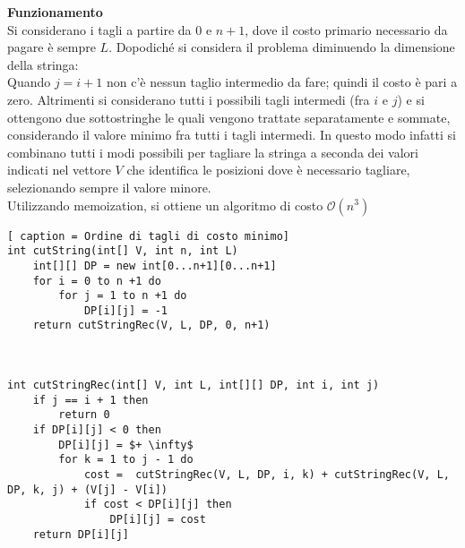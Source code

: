 \documentclass[../cheatSheetAlgoritmi.tex]{subfiles}
\begin{document}
\textbf{Funzionamento} \\
Si considerano i tagli a partire da $0$ e $n + 1$, dove il costo primario necessario da pagare è sempre $L$. Dopodiché si considera il problema diminuendo la dimensione della stringa: \\
Quando $j = i + 1$ non c'è nessun taglio intermedio da fare; quindi il costo è pari a zero. Altrimenti si considerano tutti i possibili tagli intermedi (fra $i$ e $j$) e si ottengono due sottostringhe le quali vengono trattate separatamente e sommate, considerando il valore minimo fra tutti i tagli intermedi. In questo modo infatti si combinano tutti i modi possibili per tagliare la stringa a seconda dei valori indicati nel vettore $V$ che identifica le posizioni dove è necessario tagliare, selezionando sempre il valore minore. \\
Utilizzando memoization, si ottiene un algoritmo di costo $\mathcal{O}(n^3)$
\begin{lstlisting}[ caption = Ordine di tagli di costo minimo]
int cutString(int[] V, int n, int L)
	int[][] DP = new int[0...n+1][0...n+1]
	for i = 0 to n +1 do
		for j = 1 to n +1 do
			DP[i][j] = -1
	return cutStringRec(V, L, DP, 0, n+1)



int cutStringRec(int[] V, int L, int[][] DP, int i, int j)
	if j == i + 1 then
		return 0
	if DP[i][j] < 0 then
		DP[i][j] = $+ \infty$
		for k = 1 to j - 1 do
			cost =  cutStringRec(V, L, DP, i, k) + cutStringRec(V, L, DP, k, j) + (V[j] - V[i])
			if cost < DP[i][j] then
				DP[i][j] = cost
	return DP[i][j]
\end{lstlisting}
\end{document}

